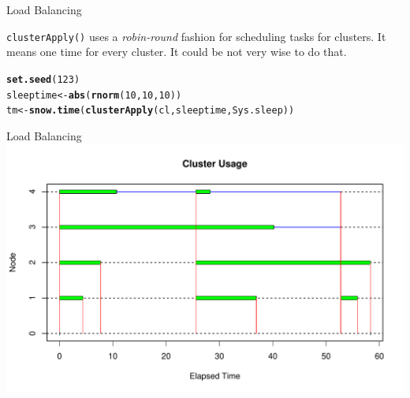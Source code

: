 \documentclass[aspectratio=169]{beamer}\usepackage[]{graphicx}\usepackage[]{color}
\makeatletter
\newcommand{\hlnum}[1]{\textcolor[rgb]{0.686,0.059,0.569}{#1}}%
\newcommand{\hlstd}[1]{\textcolor[rgb]{0.345,0.345,0.345}{#1}}%
\newcommand{\hlkwb}[1]{\textcolor[rgb]{0.69,0.353,0.396}{#1}}%
\newcommand{\hlkwd}[1]{\textcolor[rgb]{0.737,0.353,0.396}{\textbf{#1}}}%
\newenvironment{kframe}{%
 \def\at@end@of@kframe{}%
 \ifinner\ifhmode%
  \def\at@end@of@kframe{\end{minipage}}%
  \begin{minipage}{\columnwidth}%
 \fi\fi%
 \def\FrameCommand##1{\hskip\@totalleftmargin \hskip-\fboxsep
 \colorbox{shadecolor}{##1}\hskip-\fboxsep
     \hskip-\linewidth \hskip-\@totalleftmargin \hskip\columnwidth}%
 \MakeFramed {\advance\hsize-\width
   \@totalleftmargin\z@ \linewidth\hsize
   \@setminipage}}%
 {\par\unskip\endMakeFramed%
 \at@end@of@kframe}
\newenvironment{knitrout}{}{} %
\makeatother
\begin{document}
\begin{frame}[fragile]{Load Balancing}

\texttt{clusterApply()} uses a \textit{robin-round} fashion for scheduling tasks for clusters. 
It means one time for every cluster. It could be not very wise to do that.


\begin{knitrout}\scriptsize
{}\color{fgcolor}\begin{kframe}
\begin{alltt}
\hlkwd{set.seed}\hlstd{(}\hlnum{123}\hlstd{)}
\hlstd{sleeptime} \hlkwb{<-} \hlkwd{abs}\hlstd{(}\hlkwd{rnorm}\hlstd{(}\hlnum{10}\hlstd{,} \hlnum{10}\hlstd{,} \hlnum{10}\hlstd{))}
\hlstd{tm} \hlkwb{<-} \hlkwd{snow.time}\hlstd{(}\hlkwd{clusterApply}\hlstd{(cl, sleeptime, Sys.sleep))}
\end{alltt}
\end{kframe}
\end{knitrout}
\end{frame}

\begin{frame}[fragile]{Load Balancing}
\begin{knitrout}\tiny
{}\color{fgcolor}
\includegraphics[width=.89\linewidth]{figure/unnamed-chunk-9-1} 

\end{knitrout}
\end{frame}
\end{document}
